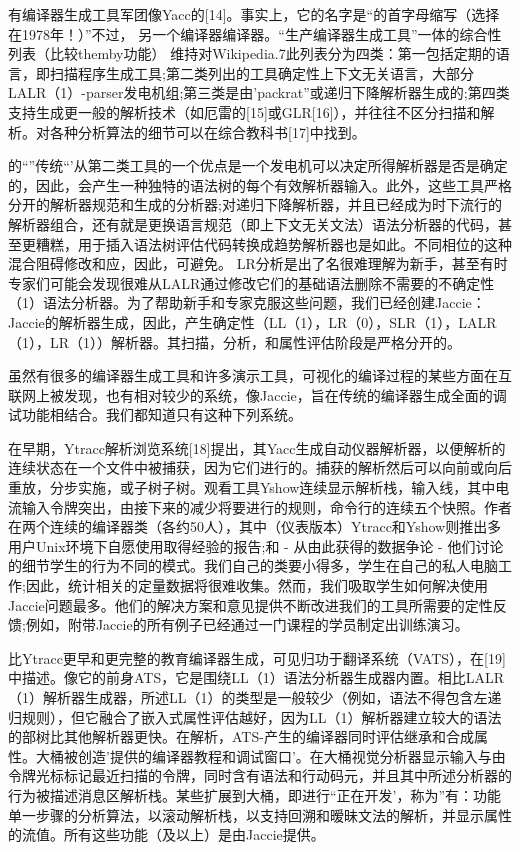 有编译器生成工具军团像Yacc的[14]。事实上，它的名字是“的首字母缩写（选择在1978年！）”不过，
另一个编译器编译器。“生产编译器生成工具”一体的综合性列表（比较themby功能）
维持对Wikipedia.7此列表分为四类：第一包括定期的语言，即扫描程序生成工具;第二类列出的工具确定性上下文无关语言，大部分LALR（1）-parser发电机组;第三类是由'packrat''或递归下降解析器生成的;第四类支持生成更一般的解析技术（如厄雷的[15]或GLR[16]），并往往不区分扫描和解析。对各种分析算法的细节可以在综合教科书[17]中找到。

的“”传统“'从第二类工具的一个优点是一个发电机可以决定所得解析器是否是确定的，因此，会产生一种独特的语法树的每个有效解析器输入。此外，这些工具严格分开的解析器规范和生成的分析器;对递归下降解析器，并且已经成为时下流行的解析器组合，还有就是更换语言规范（即上下文无关文法）语法分析器的代码，甚至更糟糕，用于插入语法树评估代码转换成趋势解析器也是如此。不同相位的这种混合阻碍修改和应，因此，可避免。 LR分析是出了名很难理解为新手，甚至有时专家们可能会发现很难从LALR通过修改它们的基础语法删除不需要的不确定性（1）语法分析器。为了帮助新手和专家克服这些问题，我们已经创建Jaccie：Jaccie的解析器生成，因此，产生确定性（LL（1），LR（0），SLR（1），LALR（1），LR（1））解析器。其扫描，分析，和属性评估阶段是严格分开的。

虽然有很多的编译器生成工具和许多演示工具，可视化的编译过程的某些方面在互联网上被发现，也有相对较少的系统，像Jaccie，旨在传统的编译器生成全面的调试功能相结合。我们都知道只有这种下列系统。

在早期，Ytracc解析浏览系统[18]提出，其Yacc生成自动仪器解析器，以便解析的连续状态在一个文件中被捕获，因为它们进行的。捕获的解析然后可以向前或向后重放，分步实施，或子树子树。观看工具Yshow连续显示解析栈，输入线，其中电流输入令牌突出，由接下来的减少将要进行的规则，命令行的连续五个快照。作者在两个连续的编译器类（各约50人），其中（仪表版本）Ytracc和Yshow则推出多用户Unix环境下自愿使用取得经验的报告;和 - 从由此获得的数据争论 - 他们讨论的细节学生的行为不同的模式。我们自己的类要小得多，学生在自己的私人电脑工作;因此，统计相关的定量数据将很难收集。然而，我们吸取学生如何解决使用Jaccie问题最多。他们的解决方案和意见提供不断改进我们的工具所需要的定性反馈;例如，附带Jaccie的所有例子已经通过一门课程的学员制定出训练演习。

比Ytracc更早和更完整的教育编译器生成，可见归功于翻译系统（VATS），在[19]中描述。像它的前身ATS，它是围绕LL（1）语法分析器生成器内置。相比LALR（1）解析器生成器，所述LL（1）的类型是一般较少（例如，语法不得包含左递归规则），但它融合了嵌入式属性评估越好，因为LL（1）解析器建立较大的语法的部树比其他解析器更快。在解析，ATS-产生的编译器同时评估继承和合成属性。大桶被创造'提供的编译器教程和调试窗口'。在大桶视觉分析器显示输入与由令牌光标标记最近扫描的令牌，同时含有语法和行动码元，并且其中所述分析器的行为被描述消息区解析栈。某些扩展到大桶，即进行“正在开发'，称为”有：功能单一步骤的分析算法，以滚动解析栈，以支持回溯和暧昧文法的解析，并显示属性的流值。所有这些功能（及以上）是由Jaccie提供。

